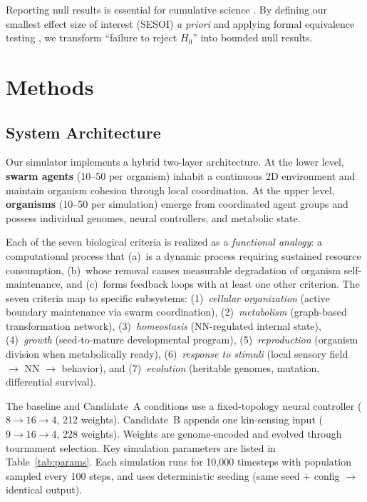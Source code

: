 \documentclass[letterpaper]{article}
\begin{document}
Reporting null results is essential for cumulative science
\citep{rosenthal_1979_file, fanelli_2012_negative}.  By defining our
smallest effect size of interest (SESOI) \emph{a priori} and applying
formal equivalence testing \citep{lakens_2017_equivalence,
lakens_2018_sesoi}, we transform ``failure to reject $H_0$'' into
bounded null results.


\section{Methods}

\subsection{System Architecture}

Our simulator implements a hybrid two-layer architecture.  At the lower
level, \textbf{swarm agents} (10--50 per organism) inhabit a continuous
2D environment and maintain organism cohesion through local coordination.
At the upper level, \textbf{organisms} (10--50 per simulation) emerge
from coordinated agent groups and possess individual genomes, neural
controllers, and metabolic state.

Each of the seven biological criteria is realized as a \emph{functional
analogy}: a computational process that (a)~is a dynamic process
requiring sustained resource consumption, (b)~whose removal causes
measurable degradation of organism self-maintenance, and (c)~forms
feedback loops with at least one other criterion.  The seven criteria map to specific subsystems:
(1)~\emph{cellular organization} (active boundary maintenance via swarm
coordination),
(2)~\emph{metabolism} (graph-based transformation network),
(3)~\emph{homeostasis} (NN-regulated internal state),
(4)~\emph{growth} (seed-to-mature developmental program),
(5)~\emph{reproduction} (organism division when metabolically ready),
(6)~\emph{response to stimuli} (local sensory field $\to$ NN $\to$
behavior), and
(7)~\emph{evolution} (heritable genomes, mutation, differential survival).

The baseline and Candidate~A conditions use a fixed-topology neural
controller ($8 \to 16 \to 4$, 212 weights).  Candidate~B appends one
kin-sensing input ($9 \to 16 \to 4$, 228 weights).  Weights are
genome-encoded and evolved through tournament selection.  Key simulation
parameters are listed in
Table~\ref{tab:params}.  Each simulation runs for 10{,}000 timesteps with
population sampled every 100 steps, and uses deterministic seeding (same
seed $+$ config $\to$ identical output).
\end{document}
